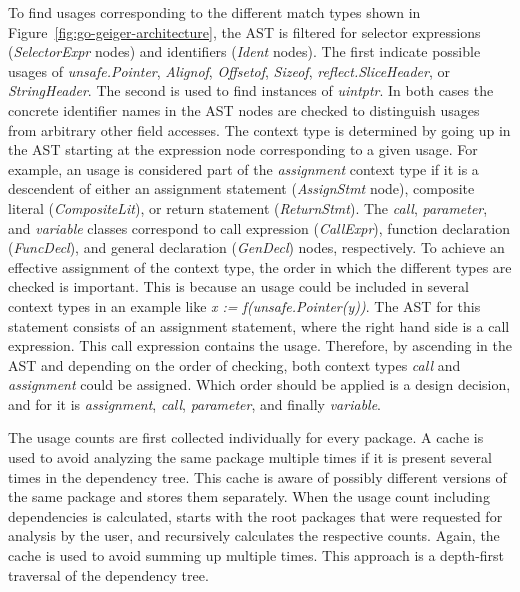 To find \unsafe{} usages corresponding to the different match types shown in Figure~\ref{fig:go-geiger-architecture},
the \acrshort{AST} is filtered for selector expressions (\textit{SelectorExpr} nodes) and identifiers (\textit{Ident}
nodes).
The first indicate possible usages of \textit{unsafe.Pointer}, \textit{Alignof}, \textit{Offsetof}, \textit{Sizeof},
\textit{reflect.SliceHeader}, or \textit{StringHeader}.
The second is used to find instances of \textit{uintptr}.
In both cases the concrete identifier names in the \acrshort{AST} nodes are checked to distinguish \unsafe{} usages from
arbitrary other field accesses.
The context type is determined by going up in the \acrshort{AST} starting at the expression node corresponding to a
given \unsafe{} usage.
For example, an \unsafe{} usage is considered part of the \textit{assignment} context type if it is a descendent of
either an assignment statement (\textit{AssignStmt} node), composite literal (\textit{CompositeLit}), or return
statement (\textit{ReturnStmt}).
The \textit{call}, \textit{parameter}, and \textit{variable} classes correspond to call expression (\textit{CallExpr}),
function declaration (\textit{FuncDecl}), and general declaration (\textit{GenDecl}) nodes, respectively.
To achieve an effective assignment of the context type, the order in which the different types are checked is important.
This is because an \unsafe{} usage could be included in several context types in an example like
\textit{x := f(unsafe.Pointer(y))}.
The \acrshort{AST} for this statement consists of an assignment statement, where the right hand side is a call
expression.
This call expression contains the \unsafe{} usage.
Therefore, by ascending in the \acrshort{AST} and depending on the order of checking, both context types \textit{call}
and \textit{assignment} could be assigned.
Which order should be applied is a design decision, and for \toolGeiger{} it is \textit{assignment}, \textit{call},
\textit{parameter}, and finally \textit{variable}.

The \unsafe{} usage counts are first collected individually for every package.
A cache is used to avoid analyzing the same package multiple times if it is present several times in the dependency
tree.
This cache is aware of possibly different versions of the same package and stores them separately.
When the usage count including dependencies is calculated, \toolGeiger{} starts with the root packages that were
requested for analysis by the user, and recursively calculates the respective counts.
Again, the cache is used to avoid summing up multiple times.
This approach is a depth-first traversal of the dependency tree.

